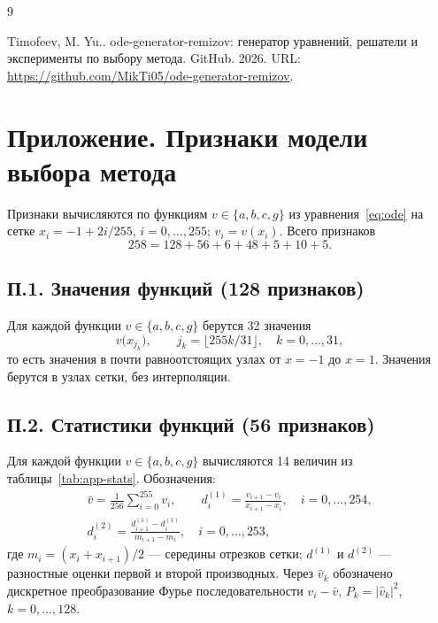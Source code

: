 \documentclass[14pt,a4paper]{extarticle}
\begin{document}
\clearpage
\renewcommand{\refname}{Список использованных источников}
{}
\begin{thebibliography}{9}
\raggedright
{} Timofeev, M. Yu.. ode-generator-remizov: генератор уравнений, решатели и эксперименты по выбору метода. GitHub. 2026. URL: \url{https://github.com/MikTi05/ode-generator-remizov}.

\end{thebibliography}

\clearpage
\section*{Приложение. Признаки модели выбора метода}
{}

Признаки вычисляются по функциям $v\in\{a,b,c,g\}$ из
уравнения~\eqref{eq:ode} на сетке $x_i=-1+2i/255$, $i=0,\dots,255$;
$v_i=v(x_i)$. Всего признаков
\[
258=128+56+6+48+5+10+5.
\]

\subsection*{П.1. Значения функций (128 признаков)}
Для каждой функции $v\in\{a,b,c,g\}$ берутся 32 значения
\[
v\bigl(x_{j_k}\bigr),\qquad j_k=\lfloor 255k/31\rfloor,\quad k=0,\dots,31,
\]
то есть значения в почти равноотстоящих узлах от $x=-1$ до $x=1$.
Значения берутся в узлах сетки, без интерполяции.

\subsection*{П.2. Статистики функций (56 признаков)}
Для каждой функции $v\in\{a,b,c,g\}$ вычисляются 14 величин из
таблицы~\ref{tab:app-stats}. Обозначения:
\begin{gather*}
\bar v=\frac1{256}\sum_{i=0}^{255}v_i,\qquad
d^{(1)}_i=\frac{v_{i+1}-v_i}{x_{i+1}-x_i},\quad i=0,\dots,254,\\
d^{(2)}_i=\frac{d^{(1)}_{i+1}-d^{(1)}_i}{m_{i+1}-m_i},\quad i=0,\dots,253,
\end{gather*}
где $m_i=(x_i+x_{i+1})/2$ --- середины отрезков сетки;
$d^{(1)}$ и $d^{(2)}$ --- разностные оценки первой и второй производных.
Через $\hat v_k$ обозначено дискретное преобразование Фурье
последовательности $v_i-\bar v$, $P_k=|\hat v_k|^2$, $k=0,\dots,128$.
\end{document}
